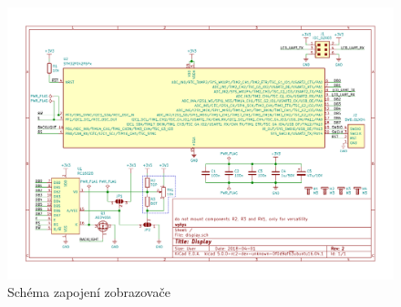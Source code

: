 \begin{landscape}
    \begin{figure}[h]
        \centering
        \includegraphics[page=1, height=\textwidth]{sch/display}
        \caption{Schéma zapojení zobrazovače}
    \end{figure}
\end{landscape}



